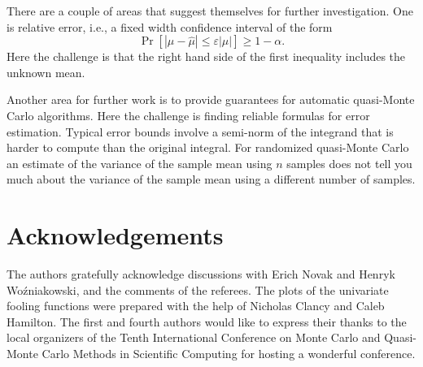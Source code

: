 \documentclass[graybox]{svmult}
\newcommand{\abs}[1]{\left|#1\right|}
\newcommand{\hmu}{\hat{\mu}}
\def\abs#1{\ensuremath{\left \lvert #1 \right \rvert}}
\begin{document}
There are a couple of areas that suggest themselves for further investigation.  One is relative error, i.e., a fixed width confidence interval of the form 
\[
\Pr[\abs{\mu-\hmu} \le \varepsilon \abs{\mu}] \ge 1-\alpha.
\]
Here the challenge is that the right hand side of the first inequality includes the unknown mean.

Another area for further work is to provide guarantees for automatic quasi-Monte Carlo algorithms. Here the challenge is finding reliable formulas for error estimation.  Typical error bounds involve a semi-norm of the integrand that is harder to compute than the original integral.  For randomized quasi-Monte Carlo an estimate of the variance of the sample mean using $n$ samples does not tell you much about the variance of the sample mean using a different number of samples.


\section*{Acknowledgements} The authors gratefully acknowledge discussions with Erich Novak and Henryk Wo\'zniakowski, and the comments of the referees.  
The plots of the univariate fooling functions were prepared with the help of Nicholas Clancy and Caleb Hamilton.  The first and fourth authors would like to express their thanks to the local organizers of the Tenth International Conference on Monte Carlo and Quasi-Monte Carlo Methods in Scientific Computing for hosting a wonderful conference.

%
%
\end{document}
